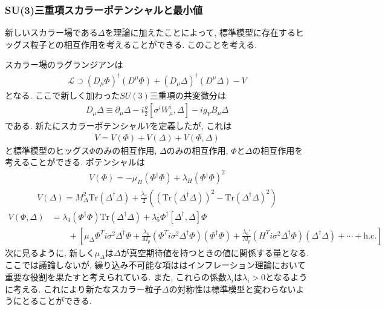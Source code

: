 \subsubsection{SU(3)三重項スカラーポテンシャルと最小値}
新しいスカラー場である$\Delta$を理論に加えたことによって, 標準模型に存在するヒッグス粒子との相互作用を考えることができる.
このことを考える.

スカラー場のラグランジアンは
\begin{align}
  \mathcal{L} \supset (D_\mu \Phi)^\dagger (D^\mu \Phi) + (D_\mu \Delta)^\dagger (D^\mu \Delta) - V\label{lagrangian_delta}
\end{align}
となる.
ここで新しく加わった$SU(3)$三重項の共変微分は
\begin{align}
  D_\mu\Delta \equiv \partial_\mu \Delta -i\frac{g}{2}[\sigma^i W_\mu^i, \Delta ] - ig_Y B_\mu \Delta\nonumber
\end{align}
である.
新たにスカラーポテンシャル$V$を定義したが, これは
\begin{align}
  V = V(\Phi) + V(\Delta) + V(\Phi, \Delta) \nonumber
\end{align}
と標準模型のヒッグス$\Phi$のみの相互作用, $\Delta$のみの相互作用, $\Phi$と$\Delta$の相互作用を考えることができる.
ポテンシャルは
\begin{align}
  V(\Phi) = -\mu_H(\Phi^\dagger \Phi) + \lambda_H (\Phi^\dagger \Phi)^2\nonumber
\end{align}
\begin{align}
  V(\Delta) = M_\Delta^2 \mathrm{Tr}(\Delta^\dagger \Delta) + \frac{\lambda_2}{2}\left( (\mathrm{Tr}(\Delta^\dagger \Delta))^2 - \mathrm{Tr}(\Delta^\dagger \Delta)^2\right)
\end{align}
\begin{align}
  V(\Phi, \Delta) &= \lambda_4(\Phi^\dagger \Phi)\mathrm{Tr}(\Delta^\dagger \Delta) + \lambda_5 \Phi^\dagger [\Delta^\dagger , \Delta]\Phi\nonumber\\
                  &\qquad + \left[\mu_\Delta \Phi^T i\sigma^2 \Delta^\dagger \Phi + \frac{\lambda_6}{M_p}(\Phi^T i\sigma^2 \Delta^\dagger \Phi)(\Phi^\dagger \Phi) + \frac{\lambda_6'}{M_p}(H^Ti\sigma^2\Delta^\dagger\Phi)(\Delta^\dagger \Delta) + \cdots +\mathrm{h.c.}\right]\nonumber
\end{align}
次に見るように, 新しく$\mu_\Delta$は$\Delta$が真空期待値を持つときの値に関係する量となる.
ここでは議論しないが, 繰り込み不可能な項ははインフレーション理論において重要な役割を果たすと考えられている.
また, これらの係数$\lambda_i$は$\lambda_i>0$となるように考える.
これにより新たなスカラー粒子$\Delta$の対称性は標準模型と変わらないようにとることができる.


